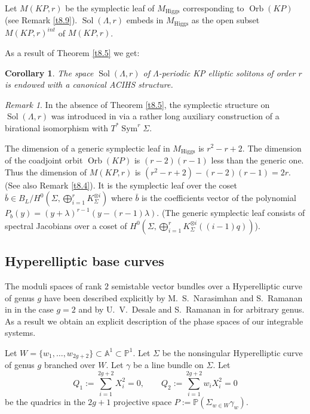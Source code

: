 \documentclass[12pt,a4paper,oneside,english]{smfart}
\newtheorem{cor}[thm]{Corollary}
\theoremstyle{definition}
\theoremstyle{remark}
\newtheorem{rem}[thm]{Remark}
\DeclareMathOperator{\Sym}{Sym}
\DeclareMathOperator{\Sol}{Sol}
\DeclareMathOperator{\Orb}{Orb}
\newcommand{\Hig}{\mathrm{Higgs}}
\newcommand{\MH}{M_{\Hig}}
\begin{document}
Let $M(KP, r)$ be the symplectic leaf of $\MH$ corresponding to $\Orb(KP)$ (see Remark \ref{t8.9}). $\Sol(\Lambda, r)$ embeds in $\MH$ as the open subset $M(KP, r)^{int}$ of $M(KP, r)$.

As a result of Theorem \ref{t8.5} we get:

\begin{cor}\label{t9.9}
The space $\Sol(\Lambda, r)$ of $\Lambda$-periodic KP elliptic solitons of order $r$ is endowed with a canonical ACIHS structure.
\end{cor}

\begin{rem}\label{t9.10}
In the absence of Theorem \ref{t8.5}, the symplectic structure on $\Sol(\Lambda, r)$ was introduced in \cite{T-V} via a rather long auxiliary construction of a birational isomorphism with $T^*\Sym^r \Sigma$.
\end{rem}

The dimension of a generic symplectic leaf in $\MH$ is $r^2 - r + 2$. The dimension of the coadjoint orbit $\Orb(KP)$ is $(r-2)(r-1)$ less than the generic one. Thus the dimension of $M(KP, r)$ is $(r^2 - r + 2) - (r-2)(r-1) = 2r$. (See also Remark \ref{t8.4}). It is the symplectic leaf over the coset $\bar{b} \in B_L/H^0(\Sigma, \bigoplus_{i=1}^{r} K_\Sigma^{\otimes i})$ where $\bar{b}$ is the coefficients vector of the polynomial $P_b(y) = (y + \lambda)^{r-1}(y - (r-1)\lambda)$. (The generic symplectic leaf consists of spectral Jacobians over a coset of $H^0(\Sigma, \bigoplus_{i=1}^{r} K_\Sigma^{\otimes i}((i-1)q))$).

\subsection{Hyperelliptic base curves}\label{sec:9.4}

The moduli spaces of rank $2$ semistable vector bundles over a Hyperelliptic curve of genus $g$ have been described explicitly by M.~S.~Narasimhan and S.~Ramanan in \cite{N-R} in the case $g = 2$ and by U.~V.~Desale and S.~Ramanan in \cite{D-R} for arbitrary genus. As a result we obtain an explicit description of the phase spaces of our integrable systems.

Let $W = \{w_1, \ldots, w_{2g+2}\} \subset \mathbb{A}^1 \subset \mathbb{P}^1$. Let $\Sigma$ be the nonsingular Hyperelliptic curve of genus $g$ branched over $W$. Let $\gamma$ be a line bundle on $\Sigma$. Let
\[
Q_1 := \sum_{i=1}^{2g+2} X_i^2 = 0, \qquad Q_2 := \sum_{i=1}^{2g+2} w_i X_i^2 = 0
\]
be the quadrics in the $2g + 1$ projective space $P := \mathbb{P}(\Sigma_{w \in W} \gamma_w)$.
\end{document}
